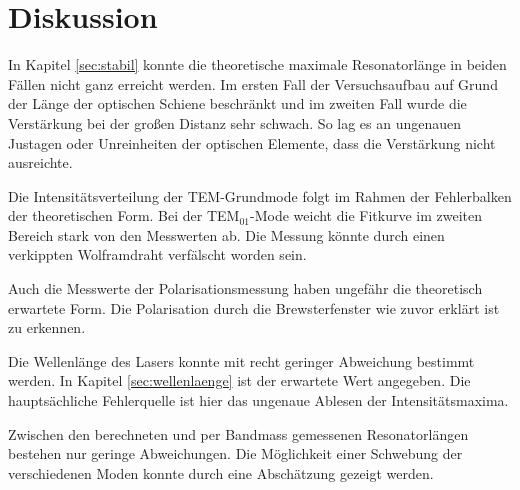 \section{Diskussion}
\label{sec:Diskussion}

In Kapitel \ref{sec:stabil} konnte die theoretische maximale Resonatorlänge in beiden Fällen nicht ganz erreicht werden. Im ersten Fall der Versuchsaufbau auf Grund der Länge der optischen Schiene beschränkt und im zweiten Fall wurde die Verstärkung bei der großen Distanz sehr schwach. So lag es an ungenauen Justagen oder Unreinheiten der optischen Elemente, dass die Verstärkung nicht ausreichte.

Die Intensitätsverteilung der TEM-Grundmode folgt im Rahmen der Fehlerbalken der theoretischen Form. Bei der TEM$_{01}$-Mode weicht die Fitkurve im zweiten Bereich stark von den Messwerten ab. Die Messung könnte durch einen verkippten Wolframdraht verfälscht worden sein.

Auch die Messwerte der Polarisationsmessung haben ungefähr die theoretisch erwartete Form. Die Polarisation durch die Brewsterfenster wie zuvor erklärt ist zu erkennen.

Die Wellenlänge des Lasers konnte mit recht geringer Abweichung bestimmt werden. In Kapitel \ref{sec:wellenlaenge} ist der erwartete Wert angegeben. Die hauptsächliche Fehlerquelle ist hier das ungenaue Ablesen der Intensitätsmaxima.

Zwischen den berechneten und per Bandmass gemessenen Resonatorlängen bestehen nur geringe Abweichungen. Die Möglichkeit einer Schwebung der verschiedenen Moden konnte durch eine Abschätzung gezeigt werden.
